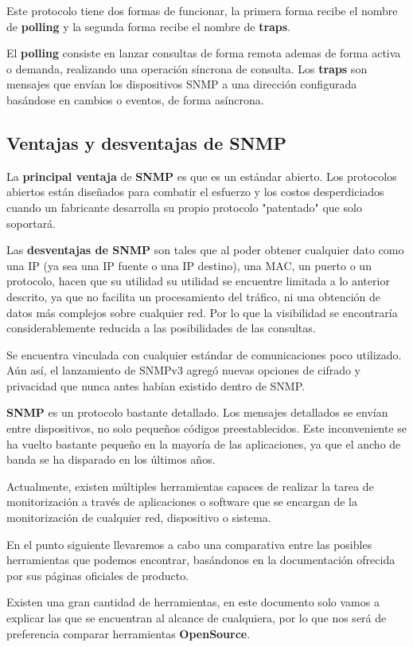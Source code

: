 Este protocolo tiene dos formas de funcionar, la primera forma recibe el nombre de \textbf{polling} y la segunda forma recibe el nombre de \textbf{traps}.

El \textbf{polling} consiste en lanzar consultas de forma remota ademas de forma activa o demanda, realizando una operación síncrona de consulta. Los \textbf{traps} son mensajes que envían los dispositivos SNMP a una dirección configurada basándose en cambios o eventos, de forma asíncrona.\cite{polling}
\subsection{Ventajas y desventajas de SNMP}
La \textbf{principal ventaja} de \textbf{SNMP} es que es un estándar abierto. Los protocolos abiertos están diseñados para combatir el esfuerzo y los costos desperdiciados cuando un fabricante desarrolla su propio protocolo "patentado" que solo soportará.

Las \textbf{desventajas de SNMP} son tales que al poder obtener cualquier dato como una IP (ya sea una IP fuente o una IP destino), una MAC, un puerto o un protocolo, hacen que su utilidad su utilidad se encuentre limitada a lo anterior descrito, ya que no facilita un procesamiento del tráfico, ni una obtención de datos más complejos sobre cualquier red. Por lo que la visibilidad se encontraría considerablemente reducida a las posibilidades de las consultas.

Se encuentra vinculada con cualquier estándar de comunicaciones poco utilizado. Aún así, el lanzamiento de SNMPv3 agregó nuevas opciones de cifrado y privacidad que nunca antes habían existido dentro de SNMP. 

\textbf{SNMP} es un protocolo bastante detallado. Los mensajes detallados se envían entre dispositivos, no solo pequeños códigos preestablecidos. Este inconveniente se ha vuelto bastante pequeño en la mayoría de las aplicaciones, ya que el ancho de banda se ha disparado en los últimos años.

Actualmente, existen múltiples herramientas capaces de realizar la tarea de monitorización a través de aplicaciones o software que se encargan de la monitorización de cualquier red, dispositivo o sistema.

En el punto siguiente llevaremos a cabo una comparativa entre las posibles herramientas que podemos encontrar, basándonos en la documentación ofrecida por sus páginas oficiales de producto.

Existen una gran cantidad de herramientas, en este documento solo vamos a explicar las que se encuentran al alcance de cualquiera, por lo que nos será de preferencia comparar herramientas \textbf{OpenSource}.

